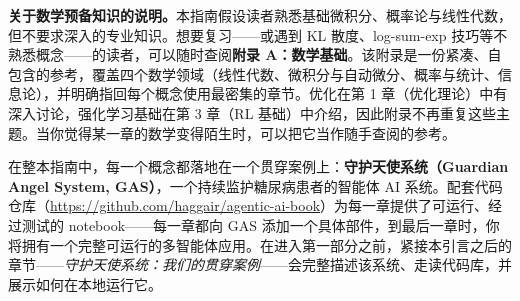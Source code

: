 \documentclass[11pt,a4paper,openany]{book}
\begin{document}
\textbf{关于数学预备知识的说明。}本指南假设读者熟悉基础微积分、概率论与线性代数，但不要求深入的专业知识。想要复习——或遇到 KL 散度、log-sum-exp 技巧等不熟悉概念——的读者，可以随时查阅\textbf{附录 A：数学基础}。该附录是一份紧凑、自包含的参考，覆盖四个数学领域（线性代数、微积分与自动微分、概率与统计、信息论），并明确指回每个概念使用最密集的章节。优化在第 1 章（优化理论）中有深入讨论，强化学习基础在第 3 章（RL 基础）中介绍，因此附录不再重复这些主题。当你觉得某一章的数学变得陌生时，可以把它当作随手查阅的参考。

在整本指南中，每一个概念都落地在一个贯穿案例上：\textbf{守护天使系统（Guardian Angel System, GAS）}，一个持续监护糖尿病患者的智能体 AI 系统。配套代码仓库（\url{https://github.com/haggair/agentic-ai-book}）为每一章提供了可运行、经过测试的 notebook——每一章都向 GAS 添加一个具体部件，到最后一章时，你将拥有一个完整可运行的多智能体应用。在进入第一部分之前，紧接本引言之后的章节——\emph{守护天使系统：我们的贯穿案例}——会完整描述该系统、走读代码库，并展示如何在本地运行它。
\end{document}
